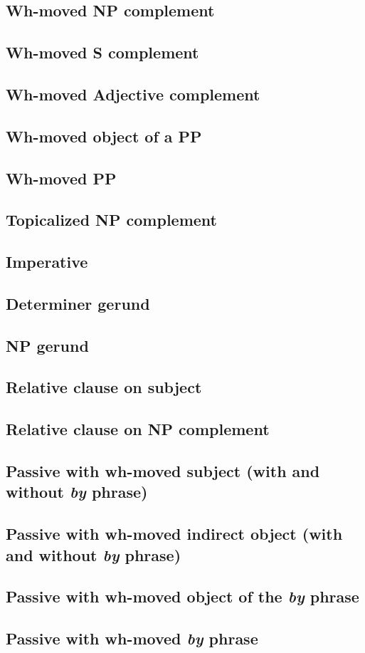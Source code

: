 \subsection{Wh-moved NP complement}
\subsection{Wh-moved S complement}
\subsection{Wh-moved Adjective complement}
\subsection{Wh-moved object of a PP}
\subsection{Wh-moved PP}
\subsection{Topicalized NP complement}
\subsection{Imperative}
\subsection{Determiner gerund}
\subsection{NP gerund}
\subsection{Relative clause on subject}
\subsection{Relative clause on NP complement}
\subsection{Passive with wh-moved subject (with and without {\it by} phrase)}
\subsection{Passive with wh-moved indirect object (with and without {\it by} phrase)}
\subsection{Passive with wh-moved object of the {\it by} phrase}
\subsection{Passive with wh-moved {\it by} phrase}

